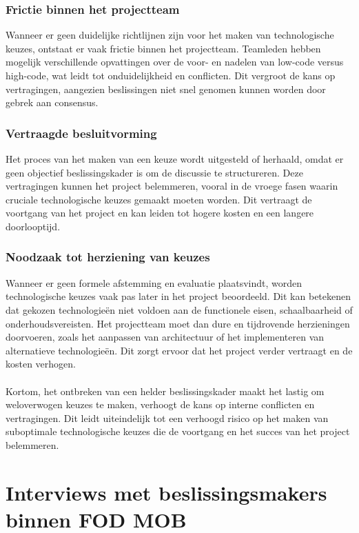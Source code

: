 \subsubsection{Frictie binnen het projectteam}
Wanneer er geen duidelijke richtlijnen zijn voor het maken van technologische keuzes, ontstaat er vaak frictie binnen het projectteam. Teamleden hebben mogelijk verschillende opvattingen over de voor- en nadelen van low-code versus high-code, wat leidt tot onduidelijkheid en conflicten. Dit vergroot de kans op vertragingen, aangezien beslissingen niet snel genomen kunnen worden door gebrek aan consensus.
\subsubsection{Vertraagde besluitvorming}
Het proces van het maken van een keuze wordt uitgesteld of herhaald, omdat er geen objectief beslissingskader is om de discussie te structureren. Deze vertragingen kunnen het project belemmeren, vooral in de vroege fasen waarin cruciale technologische keuzes gemaakt moeten worden. Dit vertraagt de voortgang van het project en kan leiden tot hogere kosten en een langere doorlooptijd.
\subsubsection{Noodzaak tot herziening van keuzes}
Wanneer er geen formele afstemming en evaluatie plaatsvindt, worden technologische keuzes vaak pas later in het project beoordeeld. Dit kan betekenen dat gekozen technologieën niet voldoen aan de functionele eisen, schaalbaarheid of onderhoudsvereisten. Het projectteam moet dan dure en tijdrovende herzieningen doorvoeren, zoals het aanpassen van architectuur of het implementeren van alternatieve technologieën. Dit zorgt ervoor dat het project verder vertraagt en de kosten verhogen.
\\
\\
Kortom, het ontbreken van een helder beslissingskader maakt het lastig om weloverwogen keuzes te maken, verhoogt de kans op interne conflicten en vertragingen. Dit leidt uiteindelijk tot een verhoogd risico op het maken van suboptimale technologische keuzes die de voortgang en het succes van het project belemmeren.

\section{Interviews met beslissingsmakers binnen \gls{FOD MOB}}

